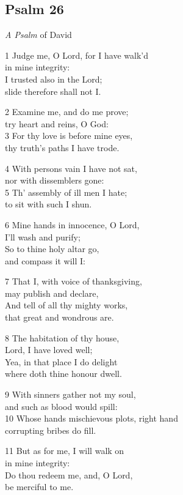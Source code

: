 \subsection*{Psalm 26 }

\emph{A Psalm} of David

1 Judge me, O Lord, for I have walk’d\\
in mine integrity:\\
I trusted also in the Lord;\\
slide therefore shall not I.

2 Examine me, and do me prove;\\
try heart and reins, O God:\\
3 For thy love is before mine eyes,\\
thy truth’s paths I have trode.

4 With persons vain I have not sat,\\
nor with dissemblers gone:\\
5 Th’ assembly of ill men I hate;\\
to sit with such I shun.

6 Mine hands in innocence, O Lord,\\
I’ll wash and purify;\\
So to thine holy altar go,\\
and compass it will I:

7 That I, with voice of thanksgiving,\\
may publish and declare,\\
And tell of all thy mighty works,\\
that great and wondrous are.

8 The habitation of thy house,\\
Lord, I have loved well;\\
Yea, in that place I do delight\\
where doth thine honour dwell.

9 With sinners gather not my soul,\\
and such as blood would spill:\\
10 Whose hands mischievous plots, right hand\\
corrupting bribes do fill.

11 But as for me, I will walk on\\
in mine integrity:\\
Do thou redeem me, and, O Lord,\\
be merciful to me.

